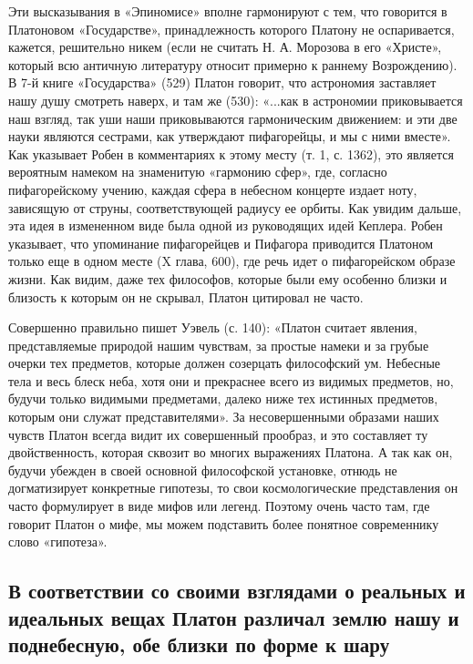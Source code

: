 Эти высказывания в «Эпиномисе» вполне гармонируют с тем, что говорится
в Платоновом «Государстве», принадлежность которого Платону не
оспаривается, кажется, решительно никем (если не считать Н. А.
Морозова в его «Христе», который всю античную литературу относит
примерно к раннему Возрождению). В 7-й книге «Государства» (529)
Платон говорит, что астрономия заставляет нашу душу смотреть наверх, и
там же (530): «...как в астрономии приковывается наш взгляд, так уши
наши приковываются гармоническим движением: и эти две науки являются
сестрами, как утверждают пифагорейцы, и мы с ними вместе». Как
указывает Робен в комментариях к этому месту (т. 1, с. 1362), это
является вероятным намеком на знаменитую «гармонию сфер», где,
согласно пифагорейскому учению, каждая сфера в небесном концерте
издает ноту, зависящую от струны, соответствующей радиусу ее орбиты.
Как увидим дальше, эта идея в измененном виде была одной из
руководящих идей Кеплера. Робен указывает, что упоминание пифагорейцев
и Пифагора приводится Платоном только еще в одном месте (X глава,
600), где речь идет о пифагорейском образе жизни. Как видим, даже тех
философов, которые были ему особенно близки и близость к которым он не
скрывал, Платон цитировал не часто.

Совершенно правильно пишет Уэвель (с. 140): «Платон считает явления,
представляемые природой нашим чувствам, за простые намеки и за грубые
очерки тех предметов, которые должен созерцать философский ум.
Небесные тела и весь блеск неба, хотя они и прекраснее всего из
видимых предметов, но, будучи только видимыми предметами, далеко ниже
тех истинных предметов, которым они служат представителями». За
несовершенными образами наших чувств Платон всегда видит их
совершенный прообраз, и это составляет ту двойственность, которая
сквозит во многих выражениях Платона. А так как он, будучи убежден в
своей основной философской установке, отнюдь не догматизирует
конкретные гипотезы, то свои космологические представления он часто
формулирует в виде мифов или легенд. Поэтому очень часто там, где
говорит Платон о мифе, мы можем подставить более понятное современнику
слово «гипотеза».

\subsection{В соответствии со своими взглядами о реальных и идеальных
вещах Платон различал землю нашу и поднебесную, обе близки по форме к
шару}

